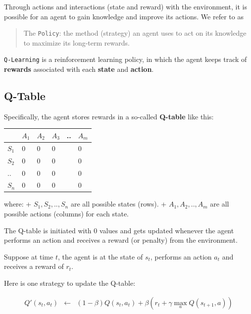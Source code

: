 \documentclass[
  letterpaper,
]{scrbook}
\newcounter{none} %
\begin{document}
Through actions and interactions (state and reward) with the
environment, it is possible for an agent to gain knowledge and improve
its actions. We refer to as

\begin{quote}
The \texttt{Policy}: the method (strategy) an agent uses to act on its
knowledge to maximize its long-term rewards.
\end{quote}

\texttt{Q-Learning} is a reinforcement learning policy, in which the
agent keeps track of \textbf{rewards} associated with each
\textbf{state} and \textbf{action}.

\subsection*{Q-Table}\label{q-table}

Specifically, the agent stores rewards in a so-called \textbf{Q-table}
like this:

{\def\LTcaptype{none} %
\begin{longtable}[]{@{}llllll@{}}
\toprule\noalign{}
& \(A_1\) & \(A_2\) & \(A_3\) & .. & \(A_m\) \\
\midrule\noalign{}
\endhead
\bottomrule\noalign{}
\endlastfoot
\(S_1\) & 0 & 0 & 0 & & 0 \\
\(S_2\) & 0 & 0 & 0 & & 0 \\
.. & 0 & 0 & 0 & & 0 \\
\(S_n\) & 0 & 0 & 0 & & 0 \\
\end{longtable}
}

where: + \(S_1, S_2, .., S_n\) are all possible states (rows). +
\(A_1, A_2, .., A_m\) are all possible actions (columns) for each state.

The Q-table is initiated with \(0\) values and gets updated whenever the
agent performs an action and receives a reward (or penalty) from the
environment.

Suppose at time \(t\), the agent is at the state of \(s_t\), performs an
action \(a_t\) and receives a reward of \(r_t\).

Here is one strategy to update the Q-table:

\begin{eqnarray}
Q'(s_t, a_t) & \leftarrow & (1-\beta) Q(s_t, a_t) + \beta (r_t + \gamma \max_a{Q(s_{t+1},a)}) 
\end{eqnarray}
\end{document}
